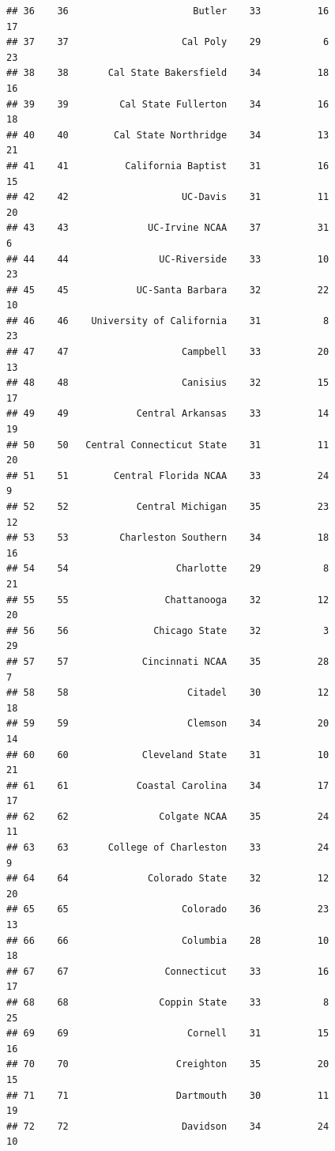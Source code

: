 \documentclass[]{book}
\begin{document}
\begin{verbatim}
## 36    36                      Butler    33          16            17
## 37    37                    Cal Poly    29           6            23
## 38    38       Cal State Bakersfield    34          18            16
## 39    39         Cal State Fullerton    34          16            18
## 40    40        Cal State Northridge    34          13            21
## 41    41          California Baptist    31          16            15
## 42    42                    UC-Davis    31          11            20
## 43    43              UC-Irvine NCAA    37          31             6
## 44    44                UC-Riverside    33          10            23
## 45    45            UC-Santa Barbara    32          22            10
## 46    46    University of California    31           8            23
## 47    47                    Campbell    33          20            13
## 48    48                    Canisius    32          15            17
## 49    49            Central Arkansas    33          14            19
## 50    50   Central Connecticut State    31          11            20
## 51    51        Central Florida NCAA    33          24             9
## 52    52            Central Michigan    35          23            12
## 53    53         Charleston Southern    34          18            16
## 54    54                   Charlotte    29           8            21
## 55    55                 Chattanooga    32          12            20
## 56    56               Chicago State    32           3            29
## 57    57             Cincinnati NCAA    35          28             7
## 58    58                     Citadel    30          12            18
## 59    59                     Clemson    34          20            14
## 60    60             Cleveland State    31          10            21
## 61    61            Coastal Carolina    34          17            17
## 62    62                Colgate NCAA    35          24            11
## 63    63       College of Charleston    33          24             9
## 64    64              Colorado State    32          12            20
## 65    65                    Colorado    36          23            13
## 66    66                    Columbia    28          10            18
## 67    67                 Connecticut    33          16            17
## 68    68                Coppin State    33           8            25
## 69    69                     Cornell    31          15            16
## 70    70                   Creighton    35          20            15
## 71    71                   Dartmouth    30          11            19
## 72    72                    Davidson    34          24            10

\end{verbatim}
\end{document}
